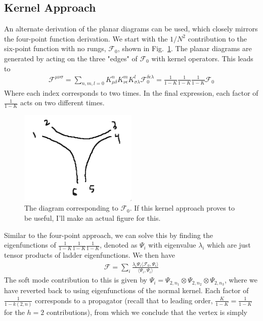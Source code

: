 \documentclass[aps,prx,preprint,onecolumn,citeautoscript,footinbib]{revtex4-1}
\begin{document}
\subsection{Kernel Approach}
An alternate derivation of the planar diagrams can be used, which closely mirrors the four-point function derivation. We start with the $1/N^2$ contribution to the six-point function with no rungs, $\mathcal{F}_0$, shown in Fig.~\ref{fig:f0}. The planar diagrams are generated by acting on the three "edges" of $\mathcal{F}_0$ with kernel operators. This leads to
\begin{equation}
    \begin{aligned}
        \mathcal{F}^{\mu \nu \sigma} = \sum_{n, m, l=0} K_{\mu \delta}^n K_{\nu \epsilon}^m K_{\sigma \lambda}^l \mathcal{F}_0^{\delta \epsilon \lambda} = \frac{1}{1-K}\frac{1}{1-K}\frac{1}{1-K} \mathcal{F}_0
    \end{aligned}
\end{equation}
Where each index corresponds to two times. In the final expression, each factor of $\frac{1}{1-K}$ acts on two different times. 
\begin{figure}
    \centering
    \includegraphics[width=0.5\textwidth]{f0}
    \caption{The diagram corresponding to $\mathcal{F}_0$. If this kernel approach proves to be useful, I'll make an actual figure for this.}
    \label{fig:f0}
\end{figure}
Similar to the four-point approach, we can solve this by finding the eigenfunctions of $\frac{1}{1-K}\frac{1}{1-K}\frac{1}{1-K}$, denoted as $\Psi_i$ with eigenvalue $\lambda_i$ which are just tensor products of ladder eigenfunctions. We then have
\begin{equation}
    \begin{aligned}
        \mathcal{F} = \sum_i \frac{\lambda_i \Psi_i \langle \mathcal{F}_0, \Psi_i\rangle}{\langle \Psi_i, \Psi_i\rangle}
    \end{aligned}
\end{equation}
The soft mode contribution to this is given by $\Psi_i = \Psi_{2, n_1} \otimes \Psi_{2, n_2} \otimes \Psi_{2, n_3}$, where we have reverted back to using eigenfunctions of the normal kernel. Each factor of $\frac{1}{1-k(2, n)}$ corresponds to a propagator (recall that to leading order, $\frac{K}{1-K} = \frac{1}{1-K}$ for the $h=2$ contributions), from which we conclude that the vertex is simply
\end{document}
